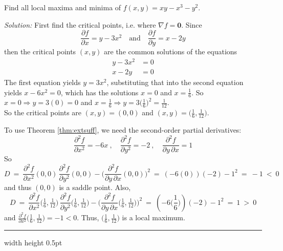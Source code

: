 \begin{exmp}
 Find all local maxima and minima of $f(x,y) = xy - x^3 - y^2$.\smallskip
 \par\noindent\emph{Solution:} First find the critical points, i.e. where $\nabla f = \textbf{0}$. Since
 \begin{displaymath}
  \frac{\partial f}{\partial x} = y - 3x^2 \quad \text{and} \quad \frac{\partial f}{\partial y} = x - 2y
 \end{displaymath}
then the critical points $(x,y)$ are the common solutions of the equations
 \begin{align*}
  y - 3x^2 &= 0\\
  x - 2y &= 0
 \end{align*}
 The first equation yields $y = 3x^2$, substituting that into the second equation yields $x - 6x^2 = 0$, which
 has the solutions $x = 0$ and $x = \frac{1}{6}$. So $x = 0 \Rightarrow y = 3(0) = 0$ and $x = \frac{1}{6} \Rightarrow
 y = 3\bigl( \frac{1}{6} \bigr)^2 = \frac{1}{12}$.\\
 So the critical points are $(x,y) = (0,0)$ and $(x,y) = \bigl( \frac{1}{6}, \frac{1}{12} \bigr)$.
 
 To use Theorem \ref{thm:extsuff}, we need the second-order partial derivatives:
 \begin{displaymath}
  \frac{\partial^2 f}{\partial x^2} = -6x ~,\quad \frac{\partial^2 f}{\partial y^2} = -2 ~,\quad
  \dfrac{\partial^2 f}{\partial y \, \partial x} = 1
 \end{displaymath}
 So
 \begin{displaymath}
  D ~=~ \dfrac{\partial^2 f}{\partial x^2}(0,0) \, \dfrac{\partial^2 f}{\partial y^2}(0,0) -
 \biggl( \dfrac{\partial^2 f}{\partial y \, \partial x}(0,0) \biggr)^2 ~=~ (-6(0))(-2) - 1^2 ~=~ -1 ~<~ 0
 \end{displaymath}
 and thus $(0,0)$ is a saddle point.
 Also,
 \begin{displaymath}
  D ~=~ \dfrac{\partial^2 f}{\partial x^2}\bigl( \tfrac{1}{6}, \tfrac{1}{12} \bigr) \, 
  \dfrac{\partial^2 f}{\partial y^2}\bigl( \tfrac{1}{6}, \tfrac{1}{12} \bigr) -
 \biggl( \dfrac{\partial^2 f}{\partial y \, \partial x}\bigl( \tfrac{1}{6}, \tfrac{1}{12} \bigr) \biggr)^2 ~=~
 (-6\bigl(\frac{1}{6}\bigr))(-2) - 1^2 ~=~ 1 ~>~ 0
 \end{displaymath}
 and $\frac{\partial^2 f}{\partial x^2}\bigl( \frac{1}{6}, \frac{1}{12} \bigr) = -1 < 0$.
 Thus, $\bigl( \frac{1}{6}, \frac{1}{12} \bigr)$ is a local maximum.
 \end{exmp}
\hrule width \textwidth height 0.5pt
